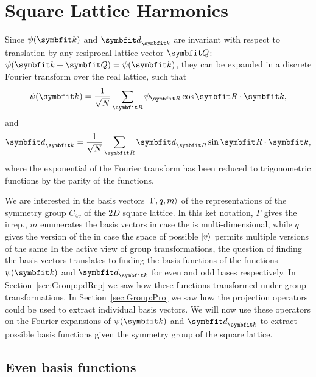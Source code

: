 \section{Square Lattice Harmonics}

Since $\psi(\v{k})$ and $\v{d}_\v{k}$ are invariant with respect to translation by any resiprocal lattice vector $\v{Q}$: $\psi(\v{k}+\v{Q}) = \psi(\v{k})$,
they can be expanded in a discrete Fourier transform over the real lattice, such that
\begin{equation}
    \label{eq:Group:SLH:psiFourier}
    \psi(\v{k}) = \frac{1}{\sqrt{N}}\sum_\v{R}\psi_\v{R}\cos\v{R}\cdot\v{k},
\end{equation}
and
\begin{equation}
    \label{eq:Group:SLH:dFourier}
    \v{d}_\v{k} = \frac{1}{\sqrt{N}}\sum_\v{R}\v{d}_\v{R}\sin\v{R}\cdot\v{k},
\end{equation}
where the exponential of the Fourier transform has been reduced to trigonometric functions by the parity of the functions.

We are interested in the basis vectors $\lvert \Gamma,q,m \rangle$ of the representations of the symmetry group $C_{4v}$ of the $2D$ square lattice. In this
ket notation, $\Gamma$ gives the irrep., $m$ enumerates the basis vectors in case the \irr is multi-dimensional, while $q$ gives the version of
the \irr in case the space of possible $\lvert v \rangle$ permits multiple versions of the same \irr In the active
view of group transformations, the question of finding the basis vectors translates to finding the basis functions of the functions $\psi(\v{k})$
and $\v{d}_\v{k}$ for even and odd bases respectively. In Section~\ref{sec:Group:pdRep} we
saw how these functions transformed under group transformations. In Section~\ref{sec:Group:Pro} we saw how the projection operators could be used
to extract individual basis vectors. We will now use these operators on the Fourier expansions of $\psi(\v{k})$ and $\v{d}_\v{k}$ to extract possible
basis functions given the symmetry group of the square lattice.

\subsection{Even basis functions}

